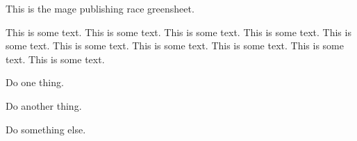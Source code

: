 \documentclass[green]{guildcamp3}
\begin{document}
	
	\name{\gMPublishing{}}
	
	
	
	
	This is the mage publishing race greensheet.
	
	This is some text.  This is some text.  This is some text.  This is
	some text.  This is some text.  This is some text.  This is some text.
	This is some text.  This is some text.  This is some text.
	
	
	\begin{enum}[Directions]
		\item Do one thing.
		\item Do another thing.
		\item Do something else.
	\end{enum}
	
	
\end{document}
